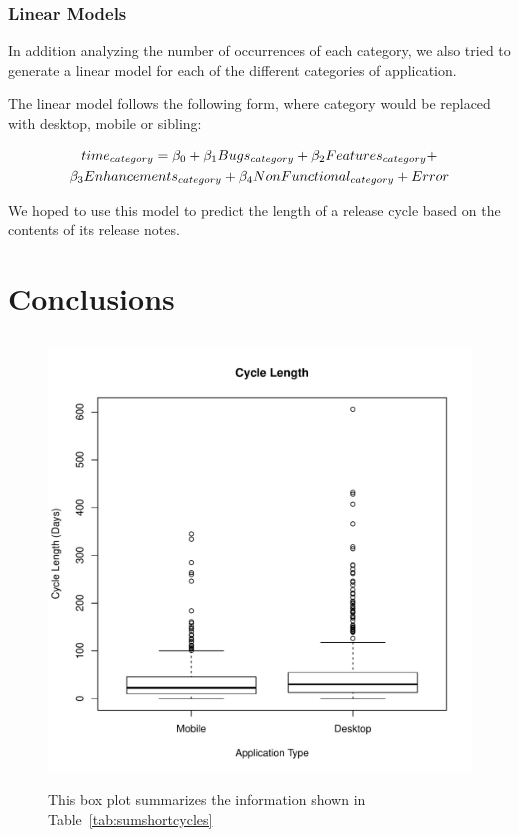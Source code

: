 \documentclass{acm_proc_article-sp}
\begin{document}
\subsubsection{Linear Models }

In addition analyzing the number of occurrences of each category, we also tried to generate a linear model for each of the different categories of application.

The linear model follows the following form, where category would be replaced with desktop, mobile or sibling:

\begin{multline}
$$time_{category} = \beta_{0} + \beta_{1}Bugs_{category} + \beta_{2}Features_{category} + \\ \beta_{3} Enhancements_{category} + \beta_{4} NonFunctional_{category} + Error $$
\end{multline}

We hoped to use this model to predict the length of a release cycle based on the contents of its release notes.

\section{Conclusions}


\subsection{\RQOne }



\begin{figure}
\includegraphics[width=.5\textwidth]{ShortCycleBoxPlot.pdf}
\label{fig:ShortCycleBox}
\caption{This box plot summarizes the information shown in Table~\ref{tab:sumshortcycles}}
\end{figure}


\label{tab:sumshortcycles}
\end{document}
